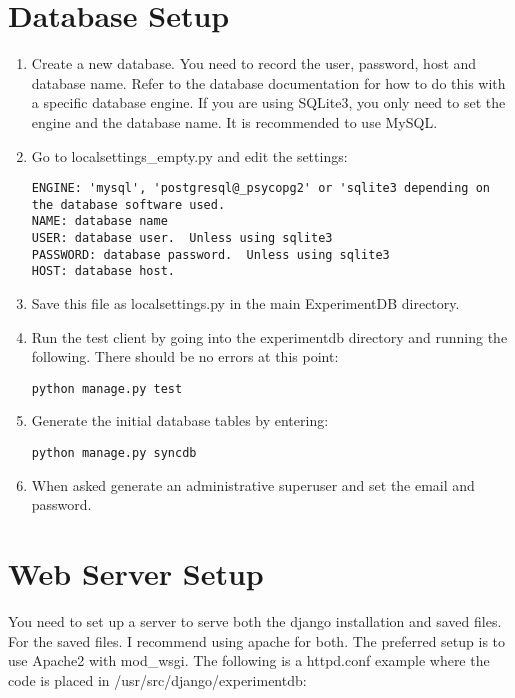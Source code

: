 \documentclass[letterpaper,10pt,english]{sphinxmanual}
\begin{document}
\section{Database Setup}
\label{installation:database-setup}\label{installation:pil}\begin{enumerate}
\item {} 
Create a new database.  You need to record the user, password, host and database name.  Refer to the database documentation for how to do this with a specific database engine.  If you are using SQLite3, you only need to set the engine and the database name.  It is recommended to use MySQL.

\item {} 
Go to localsettings\_empty.py and edit the settings:

\begin{Verbatim}[commandchars=@\[\]]
ENGINE: 'mysql', 'postgresql@_psycopg2' or 'sqlite3 depending on the database software used.
NAME: database name
USER: database user.  Unless using sqlite3
PASSWORD: database password.  Unless using sqlite3
HOST: database host.
\end{Verbatim}

\item {} 
Save this file as localsettings.py in the main ExperimentDB directory.

\item {} 
Run the test client by going into the experimentdb directory and running the following.  There should be no errors at this point:

\begin{Verbatim}[commandchars=@\[\]]
python manage.py test
\end{Verbatim}

\item {} 
Generate the initial database tables by entering:

\begin{Verbatim}[commandchars=@\[\]]
python manage.py syncdb
\end{Verbatim}

\item {} 
When asked generate an administrative superuser and set the email and password.

\end{enumerate}


\section{Web Server Setup}
\label{installation:web-server-setup}
You need to set up a server to serve both the django installation and saved files.  For the saved files.  I recommend using apache for both.  The preferred setup is to use Apache2 with mod\_wsgi.  The following is a httpd.conf example where the code is placed in /usr/src/django/experimentdb:
\end{document}
